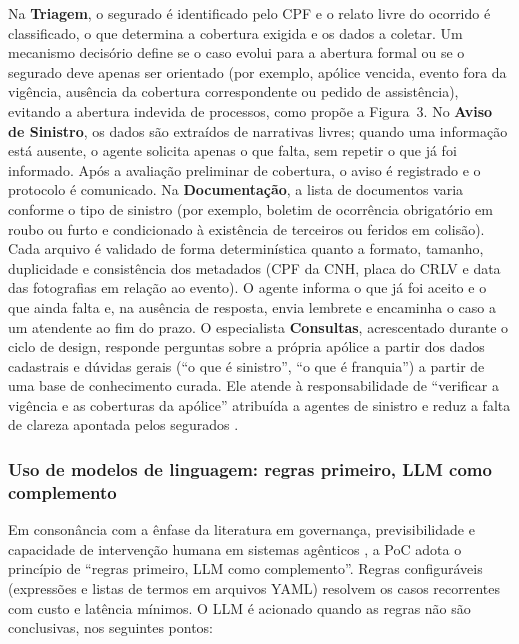 Na \textbf{Triagem}, o segurado é identificado pelo CPF e o relato livre do ocorrido é
classificado, o que determina a cobertura exigida e os dados a coletar. Um mecanismo decisório
define se o caso evolui para a abertura formal ou se o segurado deve apenas ser orientado (por
exemplo, apólice vencida, evento fora da vigência, ausência da cobertura correspondente ou
pedido de assistência), evitando a abertura indevida de processos, como propõe a Figura~3. No
\textbf{Aviso de Sinistro}, os dados são extraídos de narrativas livres; quando uma informação
está ausente, o agente solicita apenas o que falta, sem repetir o que já foi informado. Após a
avaliação preliminar de cobertura, o aviso é registrado e o protocolo é comunicado. Na
\textbf{Documentação}, a lista de documentos varia conforme o tipo de sinistro (por exemplo,
boletim de ocorrência obrigatório em roubo ou furto e condicionado à existência de terceiros
ou feridos em colisão). Cada arquivo é validado de forma determinística quanto a formato,
tamanho, duplicidade e consistência dos metadados (CPF da CNH, placa do CRLV e data das
fotografias em relação ao evento). O agente informa o que já foi aceito e o que ainda falta e,
na ausência de resposta, envia lembrete e encaminha o caso a um atendente ao fim do prazo. O
especialista \textbf{Consultas}, acrescentado durante o ciclo de design, responde perguntas
sobre a própria apólice a partir dos dados cadastrais e dúvidas gerais (``o que é sinistro'',
``o que é franquia'') a partir de uma base de conhecimento curada. Ele atende à
responsabilidade de ``verificar a vigência e as coberturas da apólice'' atribuída a agentes de
sinistro \cite{singhal2026} e reduz a falta de clareza apontada pelos segurados
\cite{capgemini2024b}.

\subsubsection{Uso de modelos de linguagem: regras primeiro, LLM como complemento}

Em consonância com a ênfase da literatura em governança, previsibilidade e capacidade de
intervenção humana em sistemas agênticos \cite{casper2025,hughes2025}, a PoC adota o princípio
de ``regras primeiro, LLM como complemento''. Regras configuráveis (expressões e listas de
termos em arquivos YAML) resolvem os casos recorrentes com custo e latência mínimos. O LLM é
acionado quando as regras não são conclusivas, nos seguintes pontos:

